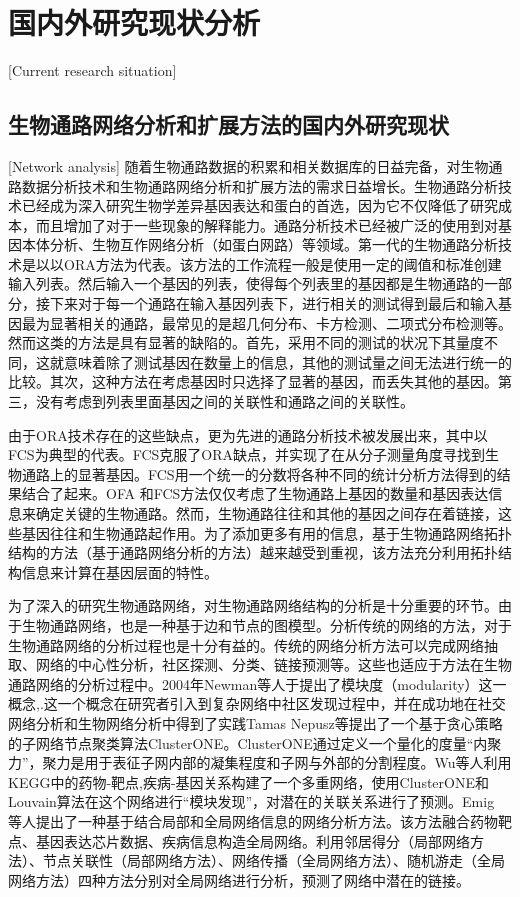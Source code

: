 \section{国内外研究现状分析}[Current research situation]
\subsection{生物通路网络分析和扩展方法的国内外研究现状}[Network analysis]
 随着生物通路数据的积累和相关数据库的日益完备，对生物通路数据分析技术和生物通路网络分析和扩展方法的需求日益增长。生物通路分析技术已经成为深入研究生物学差异基因表达和蛋白的首选，因为它不仅降低了研究成本，而且增加了对于一些现象的解释能力。通路分析技术已经被广泛的使用到对基因本体分析、生物互作网络分析（如蛋白网路）等领域。第一代的生物通路分析技术是以以ORA\cite{goeman2007analyzing}方法为代表。该方法的工作流程一般是使用一定的阈值和标准创建输入列表。然后输入一个基因的列表，使得每个列表里的基因都是生物通路的一部分，接下来对于每一个通路在输入基因列表下，进行相关的测试得到最后和输入基因最为显著相关的通路，最常见的是超几何分布、卡方检测、二项式分布检测等。然而这类的方法是具有显著的缺陷的。首先，采用不同的测试的状况下其量度不同，这就意味着除了测试基因在数量上的信息，其他的测试量之间无法进行统一的比较。其次，这种方法在考虑基因时只选择了显著的基因，而丢失其他的基因。第三，没有考虑到列表里面基因之间的关联性和通路之间的关联性。

 由于ORA技术存在的这些缺点，更为先进的通路分析技术被发展出来，其中以FCS\cite{lee2011prioritizing}为典型的代表。FCS克服了ORA缺点，并实现了在从分子测量角度寻找到生物通路上的显著基因。FCS用一个统一的分数将各种不同的统计分析方法得到的结果结合了起来。OFA 和FCS方法仅仅考虑了生物通路上基因的数量和基因表达信息来确定关键的生物通路。然而，生物通路往往和其他的基因之间存在着链接，这些基因往往和生物通路起作用。为了添加更多有用的信息，基于生物通路网络拓扑结构的方法（基于通路网络分析的方法）越来越受到重视，该方法充分利用拓扑结构信息来计算在基因层面的特性。

为了深入的研究生物通路网络，对生物通路网络结构的分析是十分重要的环节。由于生物通路网络，也是一种基于边和节点的图模型。分析传统的网络的方法，对于生物通路网络的分析过程也是十分有益的。传统的网络分析方法可以完成网络抽取、网络的中心性分析，社区探测、分类、链接预测等。这些也适应于方法在生物通路网络的分析过程中。2004年Newman\cite{newman2006modularity}等人于提出了模块度（modularity）这一概念,.这一个概念在研究者引入到复杂网络中社区发现过程中，并在成功地在社交网络分析和生物网络分析中得到了实践Tamas Nepusz\cite{nepusz2012detecting}等提出了一个基于贪心策略的子网络节点聚类算法ClusterONE。ClusterONE通过定义一个量化的度量“内聚力”，聚力是用于表征子网内部的凝集程度和子网与外部的分割程度。Wu等人利用KEGG\cite{kanehisa2008kegg}中的药物-靶点,疾病-基因关系构建了一个多重网络，使用ClusterONE和Louvain\cite{blondel2008fast}算法在这个网络进行“模块发现”，对潜在的关联关系进行了预测。Emig \cite{emig2013drug}等人提出了一种基于结合局部和全局网络信息的网络分析方法。该方法融合药物靶点、基因表达芯片数据、疾病信息构造全局网络。利用邻居得分（局部网络方法）、节点关联性（局部网络方法）、网络传播（全局网络方法）、随机游走（全局网络方法）四种方法分别对全局网络进行分析，预测了网络中潜在的链接。
